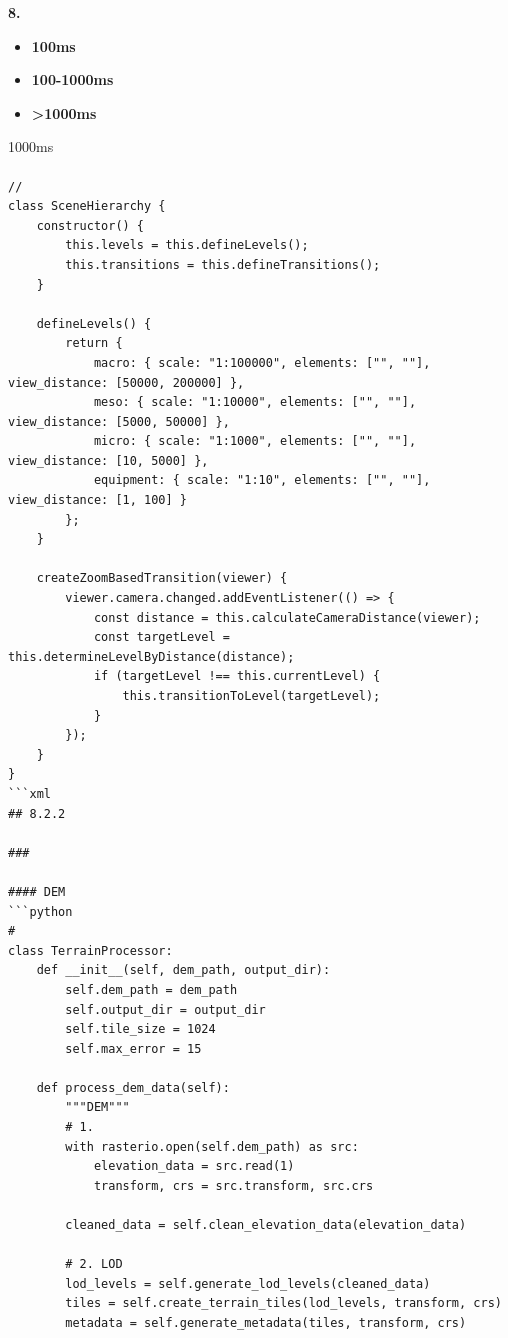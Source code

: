 \textbf{8. }

\begin{itemize}
\tightlist
\item
  \textbf{100ms}
\item
  \textbf{100-1000ms}
\item
  \textbf{\textgreater1000ms}
\end{itemize}

1000ms

\paragraph{}\label{section-22}

\begin{verbatim}
// 
class SceneHierarchy {
    constructor() {
        this.levels = this.defineLevels();
        this.transitions = this.defineTransitions();
    }
    
    defineLevels() {
        return {
            macro: { scale: "1:100000", elements: ["", ""], view_distance: [50000, 200000] },
            meso: { scale: "1:10000", elements: ["", ""], view_distance: [5000, 50000] },
            micro: { scale: "1:1000", elements: ["", ""], view_distance: [10, 5000] },
            equipment: { scale: "1:10", elements: ["", ""], view_distance: [1, 100] }
        };
    }
    
    createZoomBasedTransition(viewer) {
        viewer.camera.changed.addEventListener(() => {
            const distance = this.calculateCameraDistance(viewer);
            const targetLevel = this.determineLevelByDistance(distance);
            if (targetLevel !== this.currentLevel) {
                this.transitionToLevel(targetLevel);
            }
        });
    }
}
```xml
## 8.2.2 

### 

#### DEM
```python
# 
class TerrainProcessor:
    def __init__(self, dem_path, output_dir):
        self.dem_path = dem_path
        self.output_dir = output_dir
        self.tile_size = 1024
        self.max_error = 15
        
    def process_dem_data(self):
        """DEM"""
        # 1. 
        with rasterio.open(self.dem_path) as src:
            elevation_data = src.read(1)
            transform, crs = src.transform, src.crs
            
        cleaned_data = self.clean_elevation_data(elevation_data)
        
        # 2. LOD
        lod_levels = self.generate_lod_levels(cleaned_data)
        tiles = self.create_terrain_tiles(lod_levels, transform, crs)
        metadata = self.generate_metadata(tiles, transform, crs)
        

\end{verbatim}
